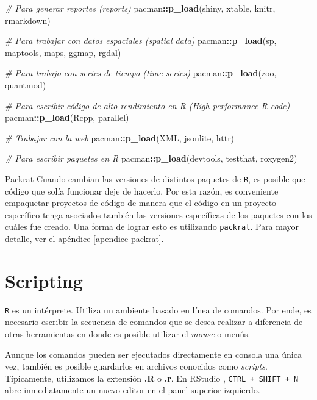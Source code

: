 \documentclass[]{article}
\newenvironment{Shaded}{\begin{snugshade}}{\end{snugshade}}
\newcommand{\KeywordTok}[1]{\textcolor[rgb]{0.13,0.29,0.53}{\textbf{#1}}}
\newcommand{\CommentTok}[1]{\textcolor[rgb]{0.56,0.35,0.01}{\textit{#1}}}
\newcommand{\OperatorTok}[1]{\textcolor[rgb]{0.81,0.36,0.00}{\textbf{#1}}}
\newcommand{\NormalTok}[1]{#1}
\begin{document}
\begin{Shaded}
\begin{Highlighting}[]
\CommentTok{# Para generar reportes (reports)}
\NormalTok{pacman}\OperatorTok{::}\KeywordTok{p_load}\NormalTok{(shiny, xtable, knitr, rmarkdown)}

\CommentTok{# Para trabajar con datos espaciales (spatial data)}
\NormalTok{pacman}\OperatorTok{::}\KeywordTok{p_load}\NormalTok{(sp, maptools, maps, ggmap, rgdal)}

\CommentTok{# Para trabajo con series de tiempo (time series)}
\NormalTok{pacman}\OperatorTok{::}\KeywordTok{p_load}\NormalTok{(zoo, quantmod)}

\CommentTok{# Para escribir código de alto rendimiento en R (High performance R code)}
\NormalTok{pacman}\OperatorTok{::}\KeywordTok{p_load}\NormalTok{(Rcpp, parallel)}

\CommentTok{# Trabajar con la web }
\NormalTok{pacman}\OperatorTok{::}\KeywordTok{p_load}\NormalTok{(XML, jsonlite, httr)}

\CommentTok{# Para escribir paquetes en R}
\NormalTok{pacman}\OperatorTok{::}\KeywordTok{p_load}\NormalTok{(devtools, testthat, roxygen2)}
\end{Highlighting}
\end{Shaded}

\begin{nota}{Packrat}
Cuando cambian las versiones de distintos paquetes de \texttt{R}, es posible
que código que solía funcionar deje de hacerlo. Por esta razón, es conveniente
empaquetar proyectos de código de manera que el código en un proyecto específico 
tenga asociados también las versiones específicas de los paquetes con los cuáles
fue creado. Una forma de lograr esto es utilizando \texttt{packrat}. Para mayor
detalle, ver el apéndice \ref{apendice-packrat}.
\end{nota}

\section{Scripting}\label{scripting}

\texttt{R} es un intérprete. Utiliza un ambiente basado en línea de
comandos. Por ende, es necesario escribir la secuencia de comandos que
se desea realizar a diferencia de otras herramientas en donde es posible
utilizar el \emph{mouse} o menús.

Aunque los comandos pueden ser ejecutados directamente en consola una
única vez, también es posible guardarlos en archivos conocidos como
\emph{scripts}. Típicamente, utilizamos la extensión \textbf{.R} o
\textbf{.r}. En RStudio \parencite{rstudio},
\texttt{CTRL\ +\ SHIFT\ +\ N} abre inmediatamente un nuevo editor en el
panel superior izquierdo.
\end{document}
